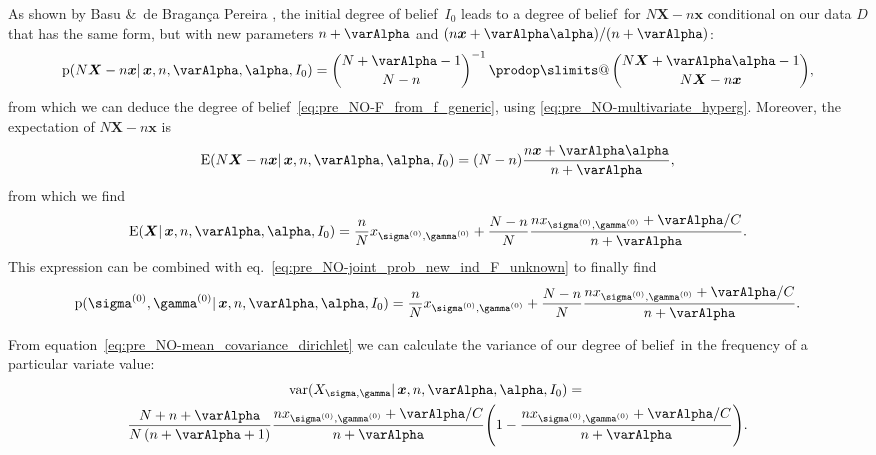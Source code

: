 \documentclass[\ifafour a4paper,12pt,\else a5paper,10pt,\fi%
onecolumn,oneside,article,%
british%
]{memoir}
\makeatletter
\theoremstyle{remark}
\theoremstyle{innote}
\def\prod{\DOTSI\prodop\slimits@}
\newcommand*{\citey}{\parencites*}
\newcommand*{\amp}{\&}
\newcommand*{\pf}{\mathrm{p}}%
\renewcommand*{\|}{\mathpunct{|}}
\newcommand*{\sect}{\S}%
\newcommand*{\eqn}{eq.}%
\newcommand*{\tprod}{\mathop{\textstyle\prod}\nolimits}
\newcommand*{\E}{\mathrm{E}}
\DeclareMathOperator{\var}{var}
\newcommand*{\dob}{degree of belief}
\newcommand*{\yD}{D}
\newcommand*{\yprod}{\tprod}
\newcommand*{\ys}{\sigma}
\newcommand*{\yg}{\gamma}
\newcommand*{\ysi}[1]{\ys^{(#1)}}
\newcommand*{\ygi}[1]{\yg^{(#1)}}
\newcommand*{\yso}{\ysi{0}}
\newcommand*{\ygo}{\ygi{0}}
\newcommand*{\yF}{\bm{X}}
\newcommand*{\yf}{\bm{x}}
\newcommand*{\yIo}{I_{0}}
\newcommand*{\yA}{\varAlpha}
\newcommand*{\ya}{\bm{\alpha}}
\makeatother
\begin{document}

As shown by Basu \amp\ de Bragan\c{c}a Pereira \citey[\sect~4,
Theorem~2]{basuetal1982}, the initial \dob\ $\yIo$ leads to a \dob\ for
$N\yF-n\yf$ conditional on our data $\yD$ that has the same form, but with
new parameters $n+\yA$ and $(n\yf+\yA\ya)/(n+\yA)$:
\begin{equation}
  \label{eq:pre_NO-dirichlet_posterior_X}
  \pf(N\yF -n\yf \| \yf, n, \yA, \ya,\yIo) =
  \binom{N+\yA-1}{N-n}^{-1} \yprod\binom{N\yF+\yA\ya-1}{N\yF-n\yf},
\end{equation}
from which we can deduce the \dob~\eqref{eq:pre_NO-F_from_f_generic}, using
\eqref{eq:pre_NO-multivariate_hyperg}. Moreover, the expectation of $N\yF-n\yf$ is
\citey[\sect~3]{basuetal1982}
\begin{equation}
  \label{eq:pre_NO-dirichlet_posterior_expectation}
  \E(N\yF -n\yf \| \yf, n, \yA, \ya,\yIo) =
  (N-n) \frac{n\yf+\yA\ya}{n+\yA},
\end{equation}
from which we find
\begin{equation}
    \label{eq:pre_NO-expect_freq_dirichlet_prior_final}
    \E(\yF \| \yf, n,\yA,\ya, \yIo)  =
    \frac{n}{N}x_{\yso, \ygo} + \frac{N-n}{N}
\frac{n x_{\yso, \ygo}+\yA/C}{n+\yA}.
\end{equation}
This expression can be combined with
\eqn~\eqref{eq:pre_NO-joint_prob_new_ind_F_unknown} to finally find
\begin{equation}
    \label{eq:pre_NO-joint_prob_new_ind_full_dirichlet_prior_final}
    \pf(\yso, \ygo \| \yf, n,\yA,\ya, \yIo)  =
    \frac{n}{N}x_{\yso, \ygo} + \frac{N-n}{N}
\frac{n x_{\yso, \ygo}+\yA/C}{n+\yA}.
\end{equation}

From equation~\eqref{eq:pre_NO-mean_covariance_dirichlet} we can calculate the
variance of our \dob\ in the frequency of a particular variate value:
\begin{multline}
  \label{eq:pre_NO-variance_single_gene_dirichlet}
  \var(X_{\ys,\yg} \| \yf, n,\yA,\ya, \yIo)  ={}\\
  \frac{N+n+\yA}{N\,(n+\yA+1)}
  \frac{n x_{\yso, \ygo}+\yA/C}{n+\yA}
  \Biggl(1- \frac{n x_{\yso, \ygo}+\yA/C}{n+\yA} \Biggr).
\end{multline}
\end{document}
